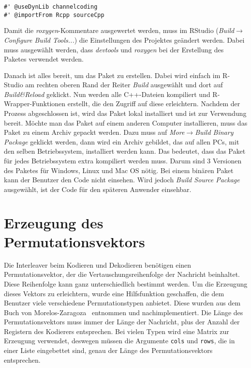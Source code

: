 \begin{lstlisting}[caption=Nötige \emph{roxygen}-Kommentare bei der Verwendung von C++-Code, label={lst:rcppNamespace}, float=!th]
#' @useDynLib channelcoding
#' @importFrom Rcpp sourceCpp
\end{lstlisting}

Damit die \emph{roxygen}-Kommentare ausgewertet werden, muss im RStudio (\emph{Build$\rightarrow$Configure Build Tools...}) die Einstellungen des Projektes geändert werden. Dabei muss ausgewählt werden, dass \emph{devtools} und \emph{roxygen} bei der Erstellung des Paketes verwendet werden.

Danach ist alles bereit, um das Paket zu erstellen. Dabei wird einfach im R-Studio am rechten oberen Rand der Reiter \emph{Build} ausgewählt und dort auf \emph{Build\&Reload} geklickt. Nun werden alle C++-Dateien kompiliert und R-Wrapper-Funktionen erstellt, die den Zugriff auf diese erleichtern. Nachdem der Prozess abgeschlossen ist, wird das Paket lokal installiert und ist zur Verwendung bereit. Möchte man das Paket auf einem anderen Computer installieren, muss das Paket zu einem Archiv gepackt werden. Dazu muss auf \emph{More$\rightarrow$Build Binary Package} geklickt werden, dann wird ein Archiv gebildet, das auf allen PCs, mit den selben Betriebssystem, installiert werden kann. Das bedeutet, dass das Paket für jedes Betriebssystem extra kompiliert werden muss. Darum sind 3 Versionen des Paketes für Windows, Linux und Mac OS nötig. Bei einem binären Paket kann der Benutzer den Code nicht einsehen. Wird jedoch \emph{Build Source Package} ausgewählt, ist der Code für den späteren Anwender einsehbar.   

\section{Erzeugung des Permutationsvektors}
\label{sec:implementation_permutation}
Die Interleaver beim Kodieren und Dekodieren benötigen einen Permutationsvektor, der die Vertauschungsreihenfolge der Nachricht beinhaltet. Diese Reihenfolge kann ganz unterschiedlich bestimmt werden. Um die Erzeugung dieses Vektors zu erleichtern, wurde eine Hilfsfunktion geschaffen, die dem Benutzer viele verschiedene Permutationstypen anbietet. Diese wurden aus dem Buch von Morelos-Zaragoza~\cite{morelos2006art} entnommen und nachimplementiert. Die Länge des Permutationsvektors muss immer der Länge der Nachricht, plus der Anzahl der Registern des Kodierers entsprechen. Bei vielen Typen wird eine Matrix zur Erzeugung verwendet, deswegen müssen die Argumente \texttt{cols} und \texttt{rows}, die in einer Liste eingebettet sind, genau der Länge des Permutationsvektors entsprechen.


